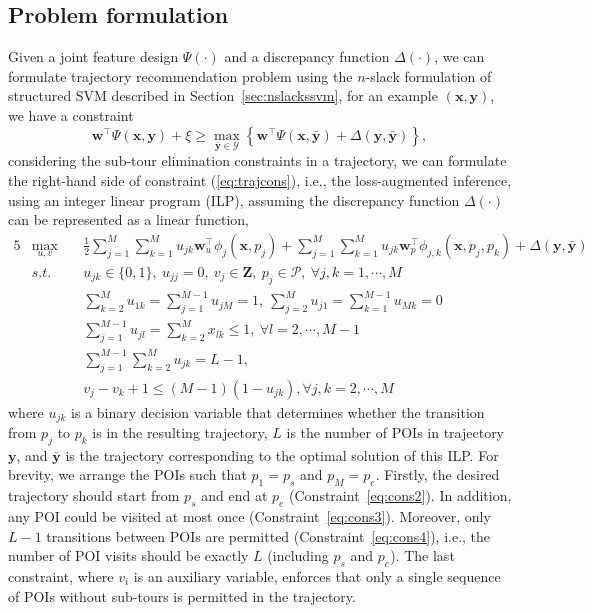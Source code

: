 {\subsection{Problem formulation}
\label{sec:trajform}

Given a joint feature design $\Psi(\cdot)$ and a discrepancy function $\Delta(\cdot)$,
we can formulate trajectory recommendation problem using the $n$-slack formulation of structured SVM described in Section~\ref{sec:nslackssvm},
for an example $(\mathbf{x}, \mathbf{y})$, we have a constraint
\begin{equation}
\label{eq:trajcons}
\mathbf{w}^\top \Psi(\mathbf{x}, \mathbf{y}) + \xi \ge
          \max_{\bar{\mathbf{y}} \in \mathcal{Y}} 
          \left\{\mathbf{w}^\top \Psi(\mathbf{x}, \bar{\mathbf{y}}) + \Delta(\mathbf{y}, \bar{\mathbf{y}}) \right\},
\end{equation}
considering the sub-tour elimination constraints in a trajectory, we can formulate the right-hand side of constraint (\ref{eq:trajcons}), 
i.e., the loss-augmented inference,
using an integer linear program (ILP), assuming the discrepancy function $\Delta(\cdot)$ can be represented as a linear function, 
\begin{alignat}{5}
& \max_{u,v} ~&& \frac{1}{2} \sum_{j=1}^M \sum_{k=1}^M u_{jk} \mathbf{w}_u^\top \phi_j(\mathbf{x}, p_j) + 
                 \sum_{j=1}^M \sum_{k=1}^M u_{jk} \mathbf{w}_p^\top \phi_{j, k}(\mathbf{x}, p_j, p_k) + \Delta(\mathbf{y}, \bar{\mathbf{y}}) \\
& s.t. ~~ ~&& u_{jk} \in \{0, 1\}, ~u_{jj} = 0, ~v_j \in \mathbf{Z},~ p_j \in \mathcal{P}, ~\forall j, k = 1, \cdots, M    \label{eq:cons1} \\
&        && \sum_{k=2}^M u_{1k} = \sum_{j=1}^{M-1} u_{jM} = 1, ~\sum_{j=2}^M u_{j1} = \sum_{k=1}^{M-1} u_{Mk} = 0  \label{eq:cons2} \\
&        && \sum_{j=1}^{M-1} u_{jl} = \sum_{k=2}^M x_{lk} \le 1,   ~\forall l=2, \cdots, M-1                       \label{eq:cons3} \\
&        && \sum_{j=1}^{M-1} \sum_{k=2}^M u_{jk} = L-1,                                                            \label{eq:cons4} \\
&        && v_j - v_k + 1 \le (M-1) (1-u_{jk}),                     \forall j, k = 2, \cdots, M                    \label{eq:cons5}
\end{alignat}
where $u_{jk}$ is a binary decision variable that determines whether the transition from $p_j$ to $p_k$ is in the resulting trajectory,
$L$ is the number of POIs in trajectory $\mathbf{y}$, and $\bar{\mathbf{y}}$ is the trajectory corresponding to the optimal solution of this ILP.
For brevity, we arrange the POIs such that $p_1 = p_s$ and $p_M = p_e$.
Firstly, the desired trajectory should start from $p_s$ and end at $p_e$ (Constraint~\ref{eq:cons2}).
In addition, any POI could be visited at most once (Constraint~\ref{eq:cons3}).
Moreover, only $L-1$ transitions between POIs are permitted (Constraint~\ref{eq:cons4}),
i.e., the number of POI visits should be exactly $L$ (including $p_s$ and $p_e$).
The last constraint, where $v_i$ is an auxiliary variable,
enforces that only a single sequence of POIs without sub-tours is permitted in the trajectory.


}
